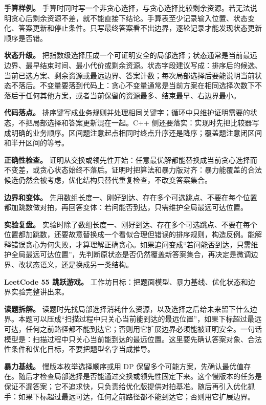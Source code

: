\textbf{手算样例。} 手算时同时写一个非贪心选择，与贪心选择比较剩余资源。若无法说明贪心后剩余资源不差，就不能直接下结论。手算表至少记录输入位置、状态变化、答案更新和停止条件。只写最终答案看不出边界，逐轮记录才能发现状态更新顺序是否错。

\textbf{状态升级。} 把指数级选择压成一个可证明安全的局部选择；状态通常是当前最远边界、最早结束时间、最小代价或剩余资源。状态字段建议写成：排序后的候选、当前已选方案、剩余资源或最远边界、答案计数；每次局部选择后要能说明当前状态不落后。不变量要落到代码上：贪心不变量通常是当前方案在相同选择次数下不落后于任何其他方案，或者当前保留的资源最多、结束最早、右边界最小。

\textbf{代码落点。} 排序键写成业务规则并处理相同关键字；循环中只维护证明需要的状态，不把局部选择和答案更新混在一起。C++ 侧还要落实：实现时先把比较器写成明确的业务顺序。区间题注意起点相同时终点升序还是降序；覆盖题注意闭区间和半开区间的等号。

\textbf{正确性检查。} 证明从交换或领先性开始：任意最优解都能替换成当前贪心选择而不变差，或贪心状态始终不落后。证明时把算法和暴力版对齐：暴力能覆盖的合法候选仍然会被考虑，优化结构只替代重复检查，不改变答案集合。

\textbf{边界和变体。} 先用数组长度一、刚好到达、存在多个可选跳点、不要在每个位置都加跳数做对拍，再回答变体：若问能否到达，只需维护全局最远可达位置。

\textbf{实验复盘。} 实验时除了数组长度一、刚好到达、存在多个可选跳点、不要在每个位置都加跳数，还要故意替换成一个看似合理但错误的排序规则，构造反例。能解释错误贪心为何失败，才算理解正确贪心。如果追问变成“若问能否到达，只需维护全局最远可达位置”，先判断原状态是否仍然覆盖新答案集合，再决定是微调边界、改状态语义，还是换成另一类结构。

\noindent\textbf{LeetCode 55 跳跃游戏。} 工作坊目标：把题面模型、暴力基线、优化状态和边界实验完整讲出来。

\textbf{读题拆解。} 读题时先找局部选择消耗什么资源，以及选择之后给未来留下什么边界。本题可以压成“扫描过程中只关心当前能到达的最远位置”，如果下标超过最远可达，任何之前路径都不能到达它；否则用它扩展边界必须能被证明安全。一句话模型是：扫描过程中只关心当前能到达的最远位置。这里要先确认答案对象、合法性条件和优化目标，不要把题型名字当成推导。

\textbf{暴力基线。} 慢版本枚举选择顺序或用 DP 保留多个可能方案，先确认最优值存在。随后才检查局部选择是否能通过交换或领先性固定下来。这个慢版本的任务是保证不漏答案；它不追求快，只负责给优化版提供对拍基准。随后再引入优化抓手：如果下标超过最远可达，任何之前路径都不能到达它；否则用它扩展边界。

